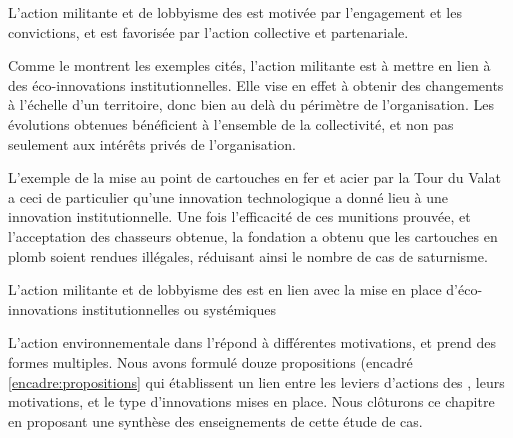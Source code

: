         \begin{hyp}
        \label{prop:K}
            L'action militante et de lobbyisme des \eess est motivée par l'engagement et les convictions, et est favorisée par l'action collective et partenariale. 
        \end{hyp}
        
        Comme le montrent les exemples cités, l'action militante est à mettre en lien à des éco-innovations institutionnelles. Elle vise en effet à obtenir des changements à l'échelle d'un territoire, donc bien au delà du périmètre de l'organisation. Les évolutions obtenues bénéficient à l'ensemble de la collectivité, et non pas seulement aux intérêts privés de l'organisation. 
        
        L'exemple de la mise au point de cartouches en fer et acier par la Tour du Valat a ceci de particulier qu'une innovation technologique a donné lieu à une innovation institutionnelle. Une fois l'efficacité de ces munitions prouvée, et l'acceptation des chasseurs obtenue, la fondation a obtenu que les cartouches en plomb soient rendues illégales, réduisant ainsi le nombre de cas de saturnisme. 
        
        \begin{hyp}
        \label{prop:L}
            L'action militante et de lobbyisme des \eess est en lien avec la mise en place d'éco-innovations institutionnelles ou systémiques
        \end{hyp}
        
        L'action environnementale dans l'\ess répond à différentes motivations, et prend des formes multiples. Nous avons formulé douze propositions (encadré \ref{encadre:propositions} qui établissent un lien entre les leviers d'actions des \oess, leurs motivations, et le type d'innovations mises en place. Nous clôturons ce chapitre en proposant une synthèse des enseignements de cette étude de cas. 
        
        
        
        
        
        
        
        
    

